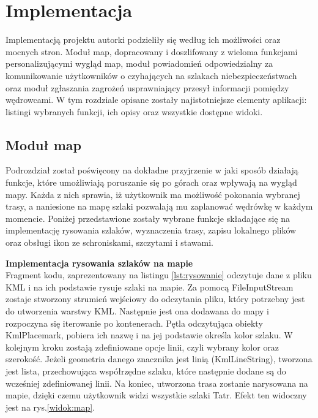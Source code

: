 \section{Implementacja}
Implementacją projektu autorki podzieliły się według ich możliwości oraz mocnych stron. Moduł map, dopracowany i doszlifowany z wieloma funkcjami personalizującymi wygląd map, moduł powiadomień odpowiedzialny za komunikowanie użytkowników o czyhających na szlakach niebezpieczeństwach oraz moduł zgłaszania zagrożeń usprawniający przesył informacji pomiędzy wędrowcami.
W tym rozdziale opisane zostały najistotniejsze elementy aplikacji: listingi wybranych funkcji, ich opisy oraz wszystkie dostępne widoki. 

\subsection{Moduł map}
Podrozdział został poświęcony na dokładne przyjrzenie w jaki sposób działają funkcje, które umożliwiają poruszanie się po górach oraz wpływają na wygląd mapy. Każda z nich sprawia, iż użytkownik ma możliwość pokonania wybranej trasy, a naniesione na mapę szlaki pozwalają mu zaplanować wędrówkę w każdym momencie. Poniżej przedstawione zostały wybrane funkcje składające się na implementację rysowania szlaków, wyznaczenia trasy, zapisu lokalnego plików oraz obsługi ikon ze schroniskami, szczytami i stawami.

\textbf{Implementacja rysowania szlaków na mapie} \\
Fragment kodu, zaprezentowany na listingu \ref{lst:rysowanie} odczytuje dane z pliku KML i na ich podstawie rysuje szlaki na mapie. Za pomocą FileInputStream zostaje stworzony strumień wejściowy do odczytania pliku, który potrzebny jest do utworzenia warstwy KML. Następnie jest ona dodawana do mapy i rozpoczyna się iterowanie po kontenerach. Pętla odczytująca obiekty KmlPlacemark, pobiera ich nazwę i na jej podstawie określa kolor szlaku. W kolejnym kroku zostają zdefiniowane opcje linii, czyli wybrany kolor oraz szerokość. Jeżeli geometria danego znacznika jest linią (KmlLineString), tworzona jest lista, przechowująca współrzędne szlaku, które następnie dodane są do wcześniej zdefiniowanej linii. Na koniec, utworzona trasa zostanie narysowana na mapie, dzięki czemu użytkownik widzi wszystkie szlaki Tatr. Efekt ten widoczny jest na rys.\ref{widok:map}.\\

